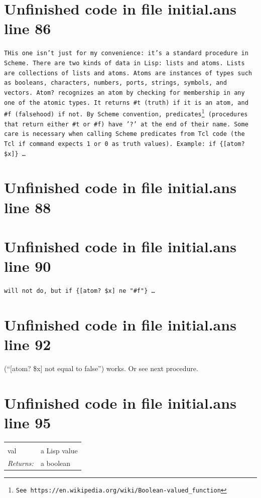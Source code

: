 \documentclass[twoside,9pt]{report}
\begin{document}
\section{Unfinished code in file initial.ans line 86}

\texttt{THis one isn't just for my convenience: it's a standard procedure in Scheme. There are two kinds of data in Lisp: lists and atoms. Lists are collections of lists and atoms. Atoms are instances of types such as booleans, characters, numbers, ports, strings, symbols, and vectors. \texttt{Atom?} recognizes an atom by checking for membership in any one of the atomic types. It returns \texttt{\#t} (truth) if it is an atom, and \texttt{\#f} (falsehood) if not. By Scheme convention, predicates\footnote{See \texttt{https://en.wikipedia.org/wiki/Boolean-valued\_function}} (procedures that return either \texttt{\#t} or \texttt{\#f}) have '?' at the end of their name. Some care is necessary when calling Scheme predicates from Tcl code (the Tcl \texttt{if} command expects 1 or 0 as truth values). Example: if \{[atom? \$x]\} \ldots }

\section{Unfinished code in file initial.ans line 88}
\section{Unfinished code in file initial.ans line 90}

\texttt{will not do, but if \{[atom? \$x] ne "\#f"\} \ldots }

\section{Unfinished code in file initial.ans line 92}

(``[atom? \$x] not equal to false'') works. Or see next procedure.

\section{Unfinished code in file initial.ans line 95}
\noindent\begin{tabular}{ |p{1.9cm} p{8cm}| }
\hline
\rowcolor[HTML]{CCCCCC} \multicolumn{2}{|l|}{\bf atom? (public)} \\
val & a Lisp value \\
\textit{Returns:} & a boolean \\
\hline
\end{tabular}
\end{document}
